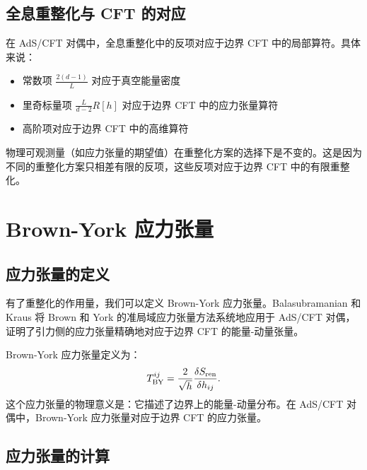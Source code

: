 \subsection{全息重整化与 CFT 的对应}

\begin{theorem}
在 AdS/CFT 对偶中，全息重整化中的反项对应于边界 CFT 中的局部算符。具体来说：
\begin{itemize}
    \item 常数项 $\frac{2(d-1)}{L}$ 对应于真空能量密度
    \item 里奇标量项 $\frac{L}{d-2} R[h]$ 对应于边界 CFT 中的应力张量算符
    \item 高阶项对应于边界 CFT 中的高维算符
\end{itemize}
\end{theorem}

\begin{remark}[重整化方案的独立性]
物理可观测量（如应力张量的期望值）在重整化方案的选择下是不变的。这是因为不同的重整化方案只相差有限的反项，这些反项对应于边界 CFT 中的有限重整化。
\end{remark}

\section{Brown-York 应力张量}

\subsection{应力张量的定义}

有了重整化的作用量，我们可以定义 Brown-York 应力张量。Balasubramanian 和 Kraus\cite{Balasubramanian1999} 将 Brown 和 York\cite{Brown1993} 的准局域应力张量方法系统地应用于 AdS/CFT 对偶，证明了引力侧的应力张量精确地对应于边界 CFT 的能量-动量张量。

\begin{definition}
Brown-York 应力张量定义为：
\begin{equation}
    T^{ij}_{\rm BY} = \frac{2}{\sqrt{h}} \frac{\delta S_{\rm ren}}{\delta h_{ij}}.
\end{equation}
这个应力张量的物理意义是：它描述了边界上的能量-动量分布。在 AdS/CFT 对偶中，Brown-York 应力张量对应于边界 CFT 的应力张量。
\end{definition}

\subsection{应力张量的计算}

